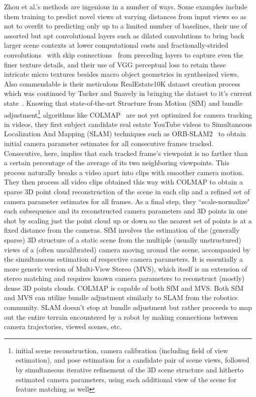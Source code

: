 Zhou et al.'s methods are ingenious in a number of ways. Some examples include them training to predict novel views at varying distances from input views so as not to overfit to predicting only up to a limited number of baselines, their use of assorted but apt convolutional layers such as dilated convolutions to bring back larger scene contexts at lower computational costs and fractionally-strided convolutions~\cite{prove_introduction_2018} with skip connections~\cite{adaloglou_intuitive_2020} from preceding layers to capture even the finer texture details, and their use of VGG perceptual loss to retain these intricate micro textures besides macro object geometries in synthesized views. Also commendable is their meticulous RealEstate10K dataset creation process which was continued by Tucker and Snavely in bringing the dataset to it's current state~\cite{zhou2018stereo}. Knowing that state-of-the-art Structure from Motion (SfM) and bundle adjustment\footnote{initial scene reconstruction, camera calibration (including field of view estimation), and pose estimation for a candidate pair of scene views, followed by simultaneous iterative refinement of the 3D scene structure and hitherto estimated camera parameters, using each additional view of the scene for feature matching as well} algorithms like COLMAP~\cite{} are not yet optimized for camera tracking in videos, they first subject candidate real estate YouTube videos to Simultaneous Localization And Mapping (SLAM) techniques such as ORB-SLAM2~\cite{} to obtain initial camera parameter estimates for all consecutive frames tracked. Consecutive, here, implies that each tracked frame's viewpoint is no farther than a certain percentage of the average of its two neighboring viewpoints. This process naturally breaks a video apart into clips with smoother camera motion. They then process all video clips obtained this way with COLMAP to obtain a sparse 3D point cloud reconstruction of the scene in each clip and a refined set of camera parameter estimates for all frames. As a final step, they ``scale-normalize" each subsequence and its reconstructed camera parameters and 3D points in one shot by scaling just the point cloud up or down so the nearest set of points is at a fixed distance from the cameras. SfM involves the estimation of the (generally sparse) 3D structure of a static scene from the multiple (usually unstructured) views of a (often uncalibrated) camera moving around the scene, accompanied by the simultaneous estimation of respective camera parameters. It is essentially a more generic version of Multi-View Stereo (MVS), which itself is an extension of stereo matching and requires known camera parameters to reconstruct (mostly) dense 3D points clouds. COLMAP is capable of both SfM and MVS. Both SfM and MVS can utilize bundle adjustment similarly to SLAM from the robotics community. SLAM doesn't stop at bundle adjustment but rather proceeds to map out the entire terrain encountered by a robot by making connections between camera trajectories, viewed scenes, etc. 

